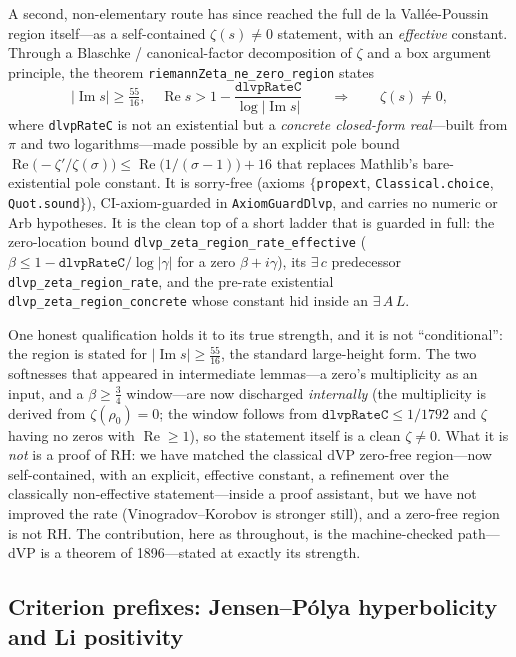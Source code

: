A second, non-elementary route has since reached the full de la Vallée-Poussin
region itself---as a self-contained $\zeta(s) \ne 0$ statement, with an
\emph{effective} constant. Through a Blaschke / canonical-factor decomposition of
$\zeta$ and a box argument principle, the theorem
\texttt{riemannZeta\_ne\_zero\_region} states
\[
  |\operatorname{Im} s| \ge \tfrac{55}{16}, \quad
  \operatorname{Re} s > 1 - \frac{\mathtt{dlvpRateC}}{\log|\operatorname{Im} s|}
  \qquad\Longrightarrow\qquad \zeta(s) \ne 0,
\]
where \texttt{dlvpRateC} is not an existential but a \emph{concrete closed-form
real}---built from $\pi$ and two logarithms---made possible by an explicit pole
bound $\operatorname{Re}\!\big({-}\zeta'/\zeta(\sigma)\big) \le
\operatorname{Re}\!\big(1/(\sigma-1)\big) + 16$ that replaces Mathlib's
bare-existential pole constant. It is sorry-free (axioms $\{$\texttt{propext},
\texttt{Classical.choice}, \texttt{Quot.sound}$\}$), CI-axiom-guarded in
\texttt{AxiomGuardDlvp}, and carries no numeric or Arb hypotheses. It is the clean
top of a short ladder that is guarded in full: the zero-location bound
\texttt{dlvp\_zeta\_region\_rate\_effective}
($\beta \le 1 - \mathtt{dlvpRateC}/\log|\gamma|$ for a zero $\beta + i\gamma$), its
$\exists\,c$ predecessor \texttt{dlvp\_zeta\_region\_rate}, and the pre-rate
existential \texttt{dlvp\_zeta\_region\_concrete} whose constant hid inside an
$\exists\,A\,L$.

One honest qualification holds it to its true strength, and it is not
``conditional'': the region is stated for $|\operatorname{Im} s| \ge \tfrac{55}{16}$,
the standard large-height form. The two softnesses that appeared in intermediate
lemmas---a zero's multiplicity as an input, and a $\beta \ge \tfrac34$ window---are
now discharged \emph{internally} (the multiplicity is derived from $\zeta(\rho_0) =
0$; the window follows from $\mathtt{dlvpRateC} \le 1/1792$ and $\zeta$ having no
zeros with $\operatorname{Re} \ge 1$), so the statement itself is a clean
$\zeta \ne 0$. What it is \emph{not} is a proof of RH: we have matched the classical
dVP zero-free region---now self-contained, with an explicit, effective constant, a
refinement over the classically non-effective statement---inside a proof assistant,
but we have not improved the rate (Vinogradov--Korobov is stronger still), and a
zero-free region is not RH. The contribution, here as throughout, is the
machine-checked path---dVP is a theorem of 1896---stated at exactly its strength.

\subsection{Criterion prefixes: Jensen--P\'olya hyperbolicity and Li positivity}

